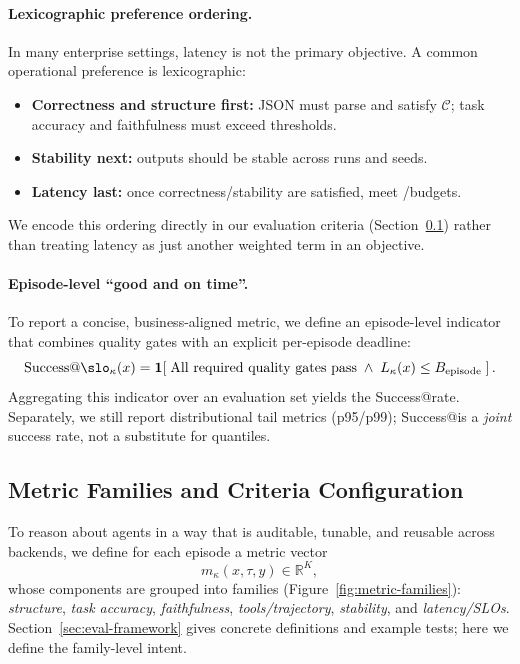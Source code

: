 \paragraph{Lexicographic preference ordering.}
In many enterprise settings, latency is not the primary objective.
A common operational preference is lexicographic:
\begin{itemize}[leftmargin=12pt]
    \item \textbf{Correctness and structure first:} JSON must parse and satisfy $\mathcal{C}$; task accuracy and faithfulness must exceed thresholds.
    \item \textbf{Stability next:} outputs should be stable across runs and seeds.
    \item \textbf{Latency last:} once correctness/stability are satisfied, meet \pninetyfive/\pninetynine budgets.
\end{itemize}
We encode this ordering directly in our evaluation criteria (Section~\ref{sec:problem-metrics}) rather than treating latency as just another weighted term in an objective.

\paragraph{Episode-level ``good and on time''.}
To report a concise, business-aligned metric, we define an episode-level indicator that combines quality gates with an explicit per-episode deadline:
\[
\text{Success@\slo}_\kappa(x)=\mathbf{1}\!\left[\;\text{All required quality gates pass}\;\wedge\; L_\kappa(x)\le B_{\text{episode}}\;\right].
\]
Aggregating this indicator over an evaluation set yields the Success@\slo rate.
Separately, we still report distributional tail metrics (p95/p99); Success@\slo is a \emph{joint} success rate, not a substitute for quantiles.

\subsection{Metric Families and Criteria Configuration}
\label{sec:problem-metrics}

To reason about agents in a way that is auditable, tunable, and reusable across backends, we define for each episode a metric vector
\[
m_\kappa(x,\tau,y)\in\mathbb{R}^K,
\]
whose components are grouped into families (Figure~\ref{fig:metric-families}):
\emph{structure}, \emph{task accuracy}, \emph{faithfulness}, \emph{tools/trajectory}, \emph{stability}, and \emph{latency/SLOs}.
Section~\ref{sec:eval-framework} gives concrete definitions and example tests; here we define the family-level intent.

